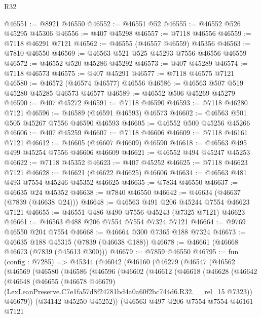 \begin{lexlean}{R32}
\begin{coremodule}
@46551 := @8921 @46550
@46552 := @46551 @52
@46555 := @46552 @526 @45295 @45306
@46556 := @407 @45298
@46557 := @7118 @46556
@46559 := @7118 @46291 @7121
@46562 := @46555 (@46557 @46559) @45356
@46563 := @7810 @46550
@46569 := @46563 @521 @525 @45293 @7556 @46556 @46559
@46572 := @46552 @520 @45286 @45292
@46573 := @407 @45289
@46574 := @7118 @46573
@46575 := @407 @45291
@46577 := @7118 @46575 @7121
@46580 := @46572 (@46574 @46577) @46556
@46586 := @46563 @507 @519 @45280 @45285 @46573 @46577
@46589 := @46552 @506 @45269 @45279
@46590 := @407 @45272
@46591 := @7118 @46590
@46593 := @7118 @46280 @7121
@46596 := @46589 (@46591 @46593) @46573
@46602 := @46563 @501 @505 @45267 @7556 @46590 @46593
@46605 := @46552 @500 @45256 @45266
@46606 := @407 @45259
@46607 := @7118 @46606
@46609 := @7118 @46161 @7121
@46612 := @46605 (@46607 @46609) @46590
@46618 := @46563 @495 @499 @45254 @7556 @46606 @46609
@46621 := @46552 @494 @45247 @45253
@46622 := @7118 @45352
@46623 := @407 @45252
@46625 := @7118 @46623 @7121
@46628 := @46621 (@46622 @46625) @46606
@46634 := @46563 @481 @493 @7554 @45246 @45352 @46625
@46635 := @7834 @46550
@46637 := @46635 @24 @45352
@46638 := @7840 @46550
@46642 := @46634 (@46637 (@7839 (@46638 @24)))
@46648 := @46563 @491 @206 @45244 @7554 @46623 @7121
@46655 := @46551 @486 @490 @7556 @45243 (@7325 @7121) @46623
@46661 := @46563 @488 @206 @7554 @7554 @7324 @7121
@46664 := @9769 @46550 @204 @7554
@46668 := @46664 @300 @7365 @188 @7324
@46673 := @46635 @188 @45315 (@7839 (@46638 @188))
@46678 := @46661 (@46668 @46673 (@7839 (@45613 @300)))
@46679 := @7859 @46550
@46795 := fun (config : @7285) =>
  @45344
    (@46042
      (@46160
        (@46279
          (@46547
            (@46562
              (@46569
                (@46580
                  (@46586
                    (@46596
                      (@46602
                        (@46612
                          (@46618
                            (@46628
                              (@46642
                                (@46648
                                  (@46655
                                    (@46678 @46679)
                                    (LexLeanPreserve.C7e1fa57d8f24781bd4a0a60f2bc744d6.R32.__rel_15
                                      @7323))
                                  @46679))
                              (@34142 @45250 @45252))
                            (@46563
                              @497
                              @206
                              @7554
                              @7554
                              @46161
                              @7121

\end{coremodule}
\end{lexlean}
